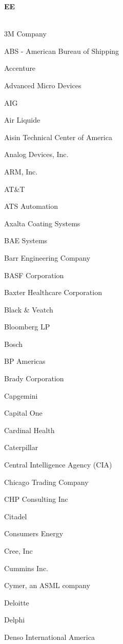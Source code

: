 \documentclass[twoside]{article}
\begin{document}
\begin{center}
\begin{multicols}{5}
        {\fontsize{14}{16}\selectfont \bf EE}\\
        \vspace{-1em}
        ~\hrulefill~
        \vspace{-.9em}
        \begin{FlushLeft}
        \begin{compactitem}
        \item 3M Company
\item ABS - American Bureau of Shipping
\item Accenture
\item Advanced Micro Devices
\item AIG
\item Air Liquide
\item Aisin Technical Center of America
\item Analog Devices, Inc.
\item ARM, Inc.
\item AT\&T
\item ATS Automation
\item Axalta Coating Systems
\item BAE Systems
\item Barr Engineering Company
\item BASF Corporation
\item Baxter Healthcare Corporation
\item Black \& Veatch
\item Bloomberg LP
\item Bosch
\item BP Americas
\item Brady Corporation
\item Capgemini
\item Capital One
\item Cardinal Health
\item Caterpillar
\item Central Intelligence Agency (CIA)
\item Chicago Trading Company
\item CHP Consulting Inc
\item Citadel
\item Consumers Energy
\item Cree, Inc
\item Cummins Inc.
\item Cymer, an ASML company
\item Deloitte
\item Delphi
\item Denso International America

\end{compactitem}
\end{FlushLeft}
\end{multicols}
\end{center}
\end{document}
